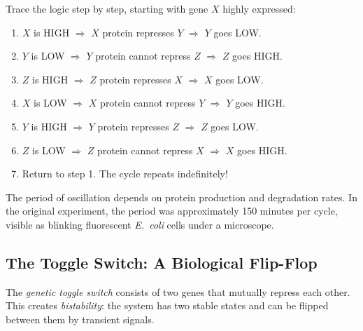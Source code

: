 \begin{example}
Trace the logic step by step, starting with gene $X$ highly expressed:

\begin{enumerate}
  \item $X$ is HIGH $\Rightarrow$ $X$ protein represses $Y$ $\Rightarrow$ $Y$ goes LOW.
  \item $Y$ is LOW $\Rightarrow$ $Y$ protein cannot repress $Z$ $\Rightarrow$ $Z$ goes HIGH.
  \item $Z$ is HIGH $\Rightarrow$ $Z$ protein represses $X$ $\Rightarrow$ $X$ goes LOW.
  \item $X$ is LOW $\Rightarrow$ $X$ protein cannot repress $Y$ $\Rightarrow$ $Y$ goes HIGH.
  \item $Y$ is HIGH $\Rightarrow$ $Y$ protein represses $Z$ $\Rightarrow$ $Z$ goes LOW.
  \item $Z$ is LOW $\Rightarrow$ $Z$ protein cannot repress $X$ $\Rightarrow$ $X$ goes HIGH.
  \item Return to step 1. The cycle repeats indefinitely!
\end{enumerate}

The period of oscillation depends on protein production and degradation rates. In the original \citet{elowitz2000} experiment, the period was approximately 150 minutes per cycle, visible as blinking fluorescent \emph{E.\ coli} cells under a microscope.
\end{example}

\subsection{The Toggle Switch: A Biological Flip-Flop}

The \emph{genetic toggle switch} \citep{gardner2000} consists of two genes that mutually repress each other. This creates \emph{bistability}: the system has two stable states and can be flipped between them by transient signals.

